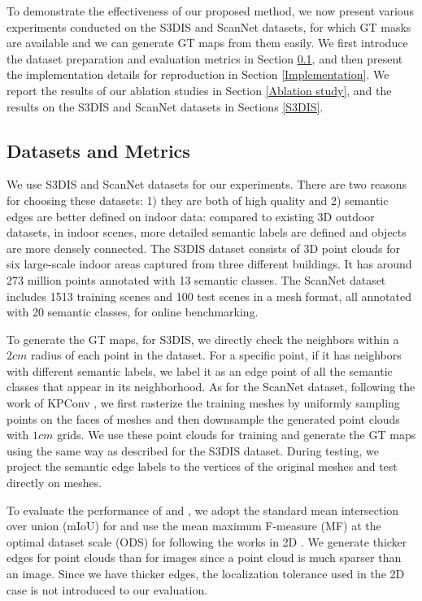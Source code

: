 \documentclass[runningheads]{llncs}
\begin{document}
To demonstrate the effectiveness of our proposed method, we now present various experiments conducted on the S3DIS \cite{armeni_cvpr16} and ScanNet\cite{dai2017scannet} datasets, for which GT {\SemSegPoint} masks are available and we can generate GT {\SemEdgePoint} maps from them easily.
{We first introduce the dataset preparation and evaluation metrics in Section \ref{Datasets}, and then present the implementation details for reproduction in Section \ref{Implementation}. We report the results of our ablation studies in Section \ref{Ablation study}, and the results on the S3DIS and ScanNet datasets in Sections \ref{S3DIS}.}


\subsection{Datasets and Metrics} \label{Datasets}


We use S3DIS \cite{armeni_cvpr16} and ScanNet \cite{dai2017scannet} datasets for our experiments. {There are two reasons for choosing these datasets: 1) they are both of high quality and 2) semantic edges are better defined on indoor data: compared to existing 3D outdoor datasets, in indoor scenes, more detailed semantic labels are defined and objects are more densely connected}.
The S3DIS dataset consists of 3D point clouds for six large-scale indoor areas captured from three different buildings. It has around 273 million points annotated with 13 semantic classes. The ScanNet dataset includes 1513 training scenes and 100 test scenes in a mesh format, all annotated with 20 semantic classes, for online benchmarking.

To generate the GT {\SemEdgePoint} maps, for S3DIS, we directly check the neighbors within a $2cm$ radius of each point in the dataset. For a specific point, if it has neighbors
with different semantic labels, we label it as an edge point of all the semantic classes that appear in its neighborhood. As for the ScanNet dataset, following the work of KPConv \cite{thomas2019kpconv}, we first rasterize the training meshes by uniformly sampling points on the faces of meshes and then downsample the generated point clouds with $1cm$ grids. {We use these point clouds for training and generate {the} GT {\SemEdgePoint} maps using the same way as described for the S3DIS dataset.}
During testing, we project the semantic edge labels to the vertices 
of the original meshes and test directly on meshes.

To evaluate the performance of {{\SemSeg} and {\SemEdgeD}}, 
we {adopt} 
the standard mean intersection over union (mIoU) for {\SemSeg} and use the mean maximum F-measure (MF) at the optimal dataset scale (ODS) for {\SemEdgeD} following the works in 2D \cite{yu2017casenet,liu2018semantic,yu2018simultaneous,acuna2019devil}. 
We generate thicker edges for point clouds than for images since a point cloud is much sparser than an image. {Since we have thicker edges, the localization tolerance used in the 2D case
is not introduced to our evaluation.}
\end{document}
